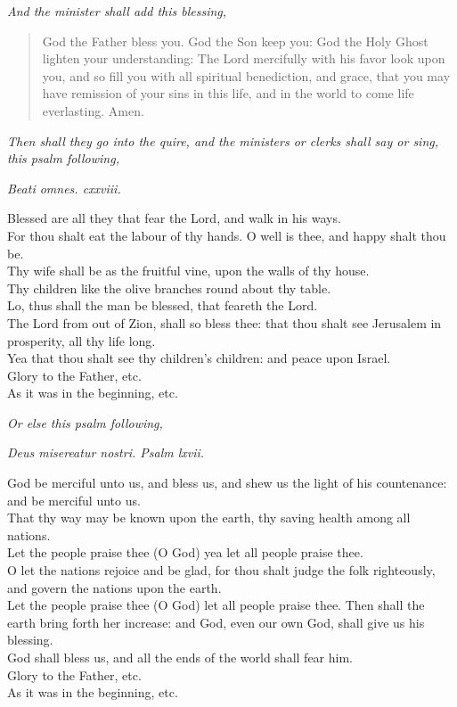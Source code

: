 \documentclass[
]{book}
\begin{document}
\emph{And the minister shall add this blessing,}

\begin{quote}
God the Father bless you. God the Son keep you: God the Holy Ghost lighten your understanding: The Lord mercifully with his favor look upon you, and so fill you with all spiritual benediction, and grace, that you may have remission of your sins in this life, and in the world to come life everlasting. Amen.
\end{quote}

\emph{Then shall they go into the quire, and the ministers or clerks shall say or sing, this psalm following,}

\emph{Beati omnes. cxxviii.}

Blessed are all they that fear the Lord, and walk in his ways.\\
For thou shalt eat the labour of thy hands. O well is thee, and happy shalt thou be.\\
Thy wife shall be as the fruitful vine, upon the walls of thy house.\\
Thy children like the olive branches round about thy table.\\
Lo, thus shall the man be blessed, that feareth the Lord.\\
The Lord from out of Zion, shall so bless thee: that thou shalt see Jerusalem in prosperity, all thy life long.\\
Yea that thou shalt see thy children's children: and peace upon Israel.\\
Glory to the Father, etc.\\
As it was in the beginning, etc.

\emph{Or else this psalm following,}

\emph{Deus misereatur nostri. Psalm lxvii.}

God be merciful unto us, and bless us, and shew us the light of his countenance: and be merciful unto us.\\
That thy way may be known upon the earth, thy saving health among all nations.\\
Let the people praise thee (O God) yea let all people praise thee.\\
O let the nations rejoice and be glad, for thou shalt judge the folk righteously, and govern the nations upon the earth.\\
Let the people praise thee (O God) let all people praise thee. Then shall the earth bring forth her increase: and God, even our own God, shall give us his blessing.\\
God shall bless us, and all the ends of the world shall fear him.\\
Glory to the Father, etc.\\
As it was in the beginning, etc.
\end{document}
